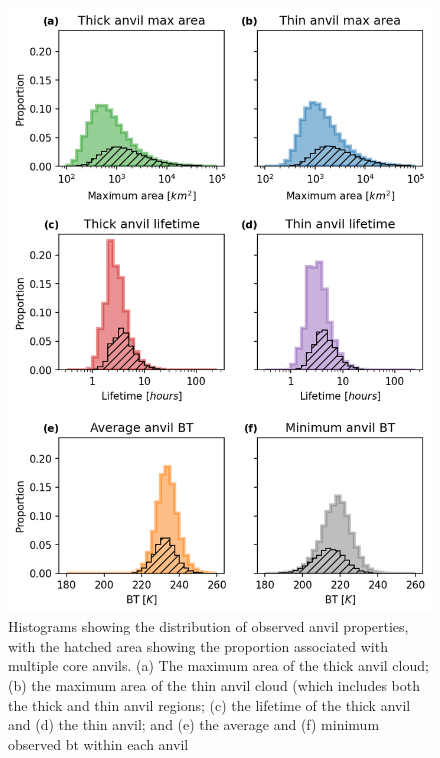 \begin{figure}[tp]
    \centering
    \includegraphics[width=\textwidth]{figures/ch2_18.png}
    \caption[
    The distribution of observed anvil properties
    ]{
    Histograms showing the distribution of observed anvil properties, with the hatched area showing the proportion associated with multiple core anvils. (a) The maximum area of the thick anvil cloud; (b) the maximum area of the thin anvil cloud (which includes both the thick and thin anvil regions; (c) the lifetime of the thick anvil and (d) the thin anvil; and (e) the average and (f) minimum observed \acrshort{bt} within each anvil
    }
    \label{fig:anvil_properties}
\end{figure}


